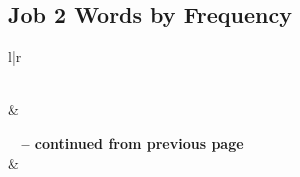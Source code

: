 \subsection{Job 2 Words by Frequency}


\normalsize
 
\begin{center}
\begin{longtable}{l|r}
\caption[Job 2 Words by Frequency]{Job 2 Words by Frequency}\label{table:WordsbyFrequency for Job 2} \\
\hline {} &  \\ \hline 
\endfirsthead
 
{{\bfseries \tablename\ \thetable{} -- continued from previous page}} \\  
\hline {} &  \\ \hline 
\endhead
 

\end{longtable}
\end{center}
